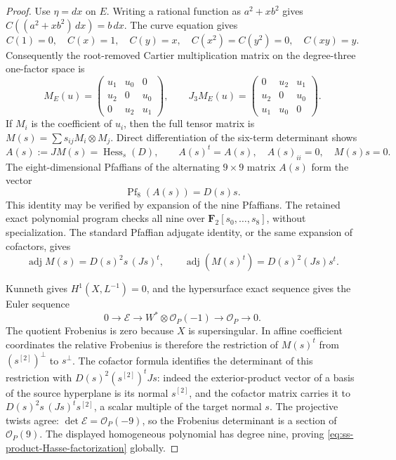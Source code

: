 \begin{proof}
Use $\eta=dx$ on $E$. Writing a rational function as $a^2+xb^2$
gives $C((a^2+xb^2)\,dx)=b\,dx$. The curve equation gives
\[
 C(1)=0,\quad C(x)=1,\quad C(y)=x,\quad
 C(x^2)=C(y^2)=0,\quad C(xy)=y.
\]
Consequently the root-removed Cartier multiplication matrix on the
degree-three one-factor space is
\[
 M_E(u)=\begin{pmatrix}u_1&u_0&0\\u_2&0&u_0\\0&u_2&u_1\end{pmatrix},
 \qquad
 J_3M_E(u)=\begin{pmatrix}0&u_2&u_1\\u_2&0&u_0\\u_1&u_0&0\end{pmatrix}.
\]
If $M_i$ is the coefficient of $u_i$, then the full tensor matrix is
$M(s)=\sum s_{ij}M_i\otimes M_j$. Direct differentiation of the
six-term determinant shows
\begin{equation}\label{eq:ss-Hessian}
 A(s):=JM(s)=\operatorname{Hess}_s(D),\qquad
 A(s)^t=A(s),\quad A(s)_{ii}=0,\quad M(s)s=0.
\end{equation}
The eight-dimensional Pfaffians of the alternating $9\times9$
matrix $A(s)$ form the vector
\[
       \operatorname{Pf}_8(A(s))=D(s)s.
\]
This identity may be verified by expansion of the nine Pfaffians.
The retained exact polynomial program checks all nine over
$\mathbf F_2[s_0,\ldots,s_8]$, without specialization. The standard
Pfaffian adjugate identity, or the same expansion of cofactors, gives
\[
 \operatorname{adj}M(s)=D(s)^2s\,(Js)^t,
 \qquad
 \operatorname{adj}(M(s)^t)=D(s)^2(Js)s^t.
\]

Kunneth gives $H^1(X,L^{-1})=0$, and the hypersurface exact sequence
gives the Euler sequence
\[
 0\longrightarrow\mathcal E\longrightarrow
 W^*\otimes\mathcal O_P(-1)\longrightarrow\mathcal O_P\longrightarrow0.
\]
The quotient Frobenius is zero because $X$ is supersingular.
In affine coefficient coordinates the relative Frobenius is therefore
the restriction of $M(s)^t$ from $(s^{[2]})^\perp$ to $s^\perp$.
The cofactor formula identifies the determinant of this restriction
with $D(s)^2(s^{[2]})^tJs$: indeed the exterior-product vector of a
basis of the source hyperplane is its normal $s^{[2]}$, and the
cofactor matrix carries it to
$D(s)^2s\,(Js)^ts^{[2]}$, a scalar multiple of the target normal $s$.
The projective twists agree: $\det\mathcal E=\mathcal O_P(-9)$, so
the Frobenius determinant is a section of $\mathcal O_P(9)$.
The displayed homogeneous polynomial has degree nine, proving
\eqref{eq:ss-product-Hasse-factorization} globally.


\end{proof}
